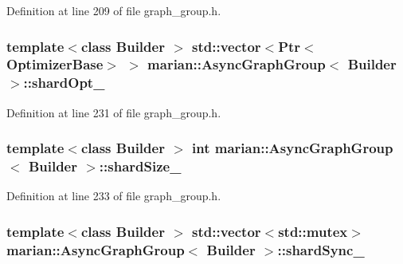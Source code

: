 Definition at line 209 of file graph\+\_\+group.\+h.

\subsubsection[{\texorpdfstring{shard\+Opt\+\_\+}{shardOpt_}}]{\setlength{\rightskip}{0pt plus 5cm}template$<$class Builder $>$ std\+::vector$<${\bf Ptr}$<${\bf Optimizer\+Base}$>$ $>$ {\bf marian\+::\+Async\+Graph\+Group}$<$ Builder $>$\+::shard\+Opt\+\_\+\hspace{0.3cm}{\ttfamily [private]}}\hypertarget{classmarian_1_1AsyncGraphGroup_a6a9bb34a29290c20f17e3ed25e08eff3}{}\label{classmarian_1_1AsyncGraphGroup_a6a9bb34a29290c20f17e3ed25e08eff3}


Definition at line 231 of file graph\+\_\+group.\+h.

\subsubsection[{\texorpdfstring{shard\+Size\+\_\+}{shardSize_}}]{\setlength{\rightskip}{0pt plus 5cm}template$<$class Builder $>$ int {\bf marian\+::\+Async\+Graph\+Group}$<$ Builder $>$\+::shard\+Size\+\_\+\hspace{0.3cm}{\ttfamily [private]}}\hypertarget{classmarian_1_1AsyncGraphGroup_a3af39dcadc6a7f84a4a906f2048fd420}{}\label{classmarian_1_1AsyncGraphGroup_a3af39dcadc6a7f84a4a906f2048fd420}


Definition at line 233 of file graph\+\_\+group.\+h.

\subsubsection[{\texorpdfstring{shard\+Sync\+\_\+}{shardSync_}}]{\setlength{\rightskip}{0pt plus 5cm}template$<$class Builder $>$ std\+::vector$<$std\+::mutex$>$ {\bf marian\+::\+Async\+Graph\+Group}$<$ Builder $>$\+::shard\+Sync\+\_\+\hspace{0.3cm}{\ttfamily [private]}}\hypertarget{classmarian_1_1AsyncGraphGroup_a5bf268b84c19070341c67f9c8617b1b2}{}\label{classmarian_1_1AsyncGraphGroup_a5bf268b84c19070341c67f9c8617b1b2}


